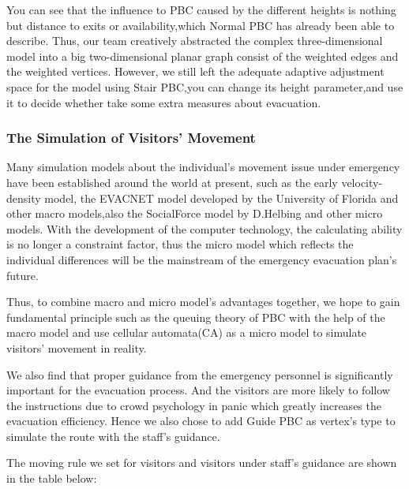 \documentclass[12pt]{article}
\begin{document}
You can see that the influence to PBC caused by the different heights is nothing but distance to exits or availability,which Normal PBC has already been able to describe.
Thus, our team creatively abstracted the complex three-dimensional model into a big two-dimensional planar graph consist of the 
weighted edges and the weighted vertices. 
However, we still left the adequate adaptive adjustment space for the model using Stair PBC,you can change its height parameter,and use it
to decide whether take some extra measures about evacuation.



\subsubsection{The Simulation of Visitors' Movement} \label{section:3.1.5}
Many simulation models about the individual's movement issue under emergency 
have been established around the world at present, such as the early 
velocity-density model\cite{15}, the EVACNET model developed by the University 
of Florida\cite{16} and other macro models,also the SocialForce model by D.Helbing\cite{17} and other micro models. With 
the development of the computer technology, the calculating ability is no 
longer a constraint factor, thus the micro model which reflects the individual 
differences will be the mainstream of the emergency evacuation plan's future.    

Thus, to combine macro and micro model's advantages together, 
we hope to gain fundamental principle such as the queuing theory 
of PBC with the help of the macro model 
and use cellular automata(CA) as a micro model to simulate visitors' 
movement in reality.  

We also find that proper guidance from the emergency personnel is 
significantly important for the evacuation process\cite{13}. 
And the visitors are more likely to follow the instructions due to 
crowd psychology in panic which greatly increases the evacuation 
efficiency. Hence we also chose to add Guide PBC as vertex's type 
to simulate the route with the staff's guidance.

The moving rule we set for visitors and visitors under staff's guidance are shown in the table below:
\end{document}
